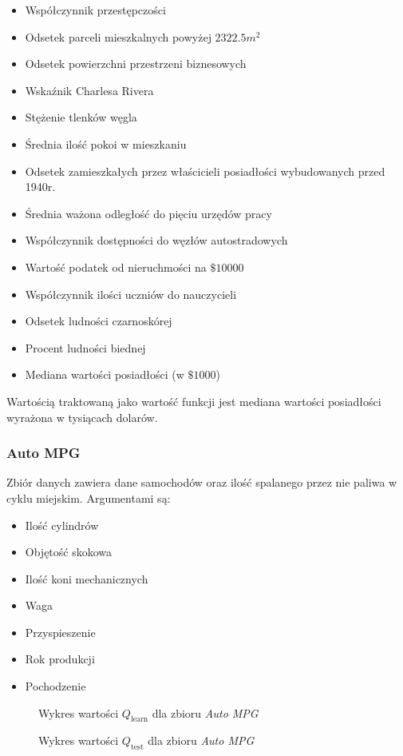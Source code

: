 \documentclass[a4paper; 11pt]{article}
\begin{document}
\begin{itemize}
\item Współczynnik przestępczości
\item Odsetek parceli mieszkalnych powyżej $2322.5m^2$
\item Odsetek powierzchni przestrzeni biznesowych
\item Wskaźnik Charlesa Rivera
\item Stężenie tlenków węgla
\item Średnia ilość pokoi w mieszkaniu
\item Odsetek zamieszkałych przez właścicieli posiadłości wybudowanych przed 1940r.
\item Średnia ważona odległość do pięciu urzędów pracy
\item Współczynnik dostępności do węzłów autostradowych
\item Wartość podatek od nieruchmości na $\$10000$
\item Współczynnik ilości uczniów do nauczycieli
\item Odsetek ludności czarnoskórej
\item Procent ludności biednej
\item Mediana wartości posiadłości (w $\$1000$)
\end{itemize}

Wartością traktowaną jako wartość funkcji jest mediana wartości posiadłości wyrażona w tysiącach dolarów.

\subsubsection{Auto MPG}
Zbiór danych zawiera dane samochodów oraz ilość spalanego przez nie paliwa w cyklu miejskim. Argumentami są:

\begin{itemize}
\item Ilość cylindrów
\item Objętość skokowa
\item Ilość koni mechanicznych
\item Waga
\item Przyspieszenie
\item Rok produkcji
\item Pochodzenie
\end{itemize}

\begin{figure}[h]
    \centering
    \begin{minipage}{0.45\textwidth}
        \centering
        \resizebox{1.2\textwidth}{!}{}
        \caption{Wykres wartości $Q_\text{learn}$ dla zbioru \emph{Auto MPG}}
        \label{fig:mpg_learn}
    \end{minipage}\hfill
    \begin{minipage}{0.45\textwidth}
        \centering
        \resizebox{1.2\textwidth}{!}{}
        \caption{Wykres wartości $Q_\text{test}$ dla zbioru \emph{Auto MPG}}
        \label{fig:mpg_test}
    \end{minipage}
\end{figure}
\end{document}

